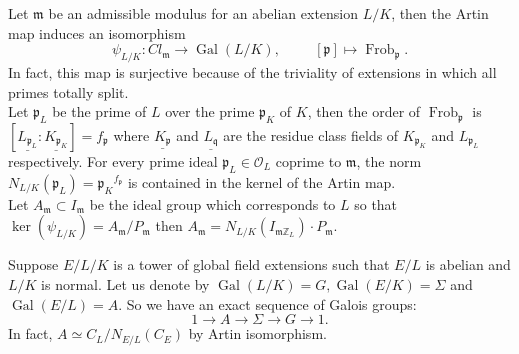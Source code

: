 \documentclass{article}
\theoremstyle{break}
\newtheorem{theorem}{Theorem}[section]
\def\Gal{\mathop{\mathrm{Gal}}\nolimits}
\def\Gal{\mathop{\mathrm{Gal}}\nolimits}
\def\ker{\mathop{\mathrm{ker}}\nolimits}
\def\Frob{\mathop{\mathrm{Frob}}\nolimits}
\def\Gal{\mathop{\mathrm{Gal}}\nolimits}
\begin{document}
Let $\mathfrak{m}$ be an admissible modulus for an abelian extension $L/K$, then the Artin map induces an isomorphism 
\[ \psi_{L/K}: Cl_{\mathfrak{m}} \rightarrow \Gal(L/K), \hspace{1cm} [\mathfrak{p}]\mapsto \Frob_{\mathfrak{p}}. \]
In fact, this map is surjective because of the triviality of extensions in which all primes totally split\cite{Cohen1}.\\
Let $\mathfrak{p}_{L}$ be the prime  of $L$ over the prime $\mathfrak{p}_{K}$ of $K$, then the order of $\Frob_{\mathfrak{p}}$  is $[\underline{L_{\mathfrak{p}_{L}}}:\underline{K_{\mathfrak{p}_{K}}}]=f_\mathfrak{p}$ where $\underline{K_{\mathfrak{p}}}$ and  $\underline{L_{\mathfrak{q}}}$ are the residue class fields of $K_{\mathfrak{p}_K}$  and $L_{\mathfrak{p}_L}$ respectively. For every prime ideal $\mathfrak{p}_{L}\in \mathcal{O}_{L}$ coprime to $\mathfrak{m}$, the norm $N_{L/K}(\mathfrak{p}_L)={\mathfrak{p}_K}^{f_{\mathfrak{p}}} $ is contained in the kernel of the Artin map.\\
Let $A_{\mathfrak{m}} \subset I_{\mathfrak{m}}$ be the ideal group which corresponds to $L$ so that $\ker(\psi_{L/K})= A_{\mathfrak{m}}/ P_{\mathfrak{m}}$ then $A_{\mathfrak{m}}= N_{L/K}(I_{\mathfrak{m}\mathbb{Z}_{L}})\cdot P_{\mathfrak{m}}$.


Suppose $E/L/K$ is a tower of global field extensions such that $E/L$ is abelian and $L/K$ is normal. Let us denote by $\Gal(L/K)=G, \Gal(E/K)=\Sigma$ and $\Gal(E/L)=A$. So we have an exact sequence of Galois groups: 
\[ 1\rightarrow A \rightarrow \Sigma \rightarrow G \rightarrow 1. \]
In fact, $A\simeq C_{L}/N_{E/L}(C_E)$ by Artin isomorphism.\\
\end{document}
